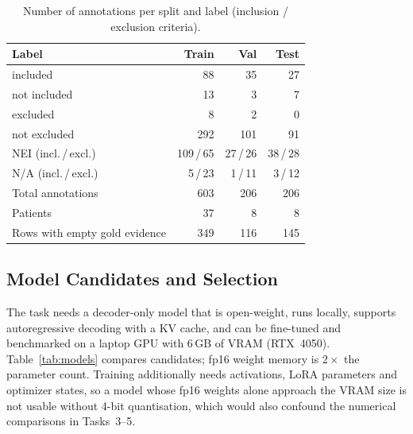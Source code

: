 \begin{table}[t]
\caption{Number of annotations per split and label (inclusion / exclusion criteria).}
\label{tab:data}
\centering\footnotesize
\begin{tabular}{lrrr}
\hline
Label & Train & Val & Test \\
\hline
included & 88 & 35 & 27 \\
not included & 13 & 3 & 7 \\
excluded & 8 & 2 & 0 \\
not excluded & 292 & 101 & 91 \\
NEI (incl.\,/\,excl.) & 109\,/\,65 & 27\,/\,26 & 38\,/\,28 \\
N/A (incl.\,/\,excl.) & 5\,/\,23 & 1\,/\,11 & 3\,/\,12 \\
\hline
Total annotations & 603 & 206 & 206 \\
Patients & 37 & 8 & 8 \\
Rows with empty gold evidence & 349 & 116 & 145 \\
\hline
\end{tabular}
\end{table}

\subsection{Model Candidates and Selection}
The task needs a decoder-only model that is open-weight, runs locally, supports autoregressive decoding with a KV cache, and can be fine-tuned and benchmarked on a laptop GPU with 6\,GB of VRAM (RTX~4050). Table~\ref{tab:models} compares candidates; fp16 weight memory is $2\times$ the parameter count. Training additionally needs activations, LoRA parameters and optimizer states, so a model whose fp16 weights alone approach the VRAM size is not usable without 4-bit quantisation, which would also confound the numerical comparisons in Tasks~3--5.

